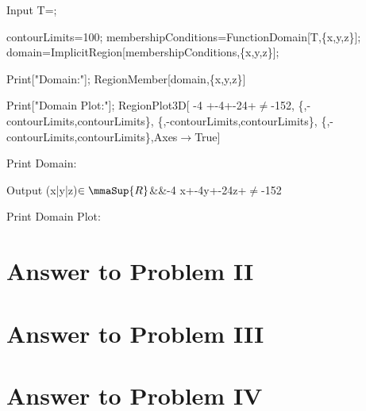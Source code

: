\documentclass[11pt,a4paper]{article}
\begin{document}
\begin{mmaCell}[]{Input}
T=;

contourLimits=100;
membershipConditions=FunctionDomain[T,\{x,y,z\}];
domain=ImplicitRegion[membershipConditions,\{x,y,z\}];

Print["Domain:"];
RegionMember[domain,\{x,y,z\}]

Print["Domain Plot:"];
RegionPlot3D[
-4 +-4+-24+\(\pmb{\neq}\)-152,
\{,-contourLimits,contourLimits\},
\{,-contourLimits,contourLimits\},
\{,-contourLimits,contourLimits\},Axes\(\pmb{\to}\)True]
\end{mmaCell}

\begin{mmaCell}{Print}
Domain:
\end{mmaCell}

\begin{mmaCell}[]{Output}
(x|y|z)\(\in\mmaSup{R}\)&&-4 x+-4y+-24z+\(\neq\)-152
\end{mmaCell}

\begin{mmaCell}{Print}
Domain Plot:
\end{mmaCell}



\clearpage

\section{Answer to Problem II}\label{sec:P02}



\clearpage

\section{Answer to Problem III}\label{sec:P03}



\clearpage

\section{Answer to Problem IV}\label{sec:P04}
\end{document}
